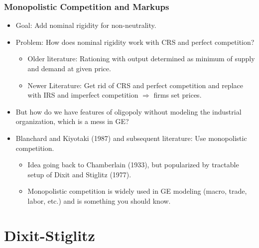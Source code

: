 \documentclass[english,xcolor=svgnames]{beamer}
\begin{document}
\begin{frame}
\frametitle{Monopolistic Competition and Markups}
\begin{itemize}
	\item Goal: Add nominal rigidity for non-neutrality.
	\item Problem: How does nominal rigidity work with CRS and
perfect competition?
	\begin{itemize}
		\item Older literature: Rationing with output determined as minimum of supply and demand at given price.
		\item Newer Literature: Get rid of CRS and perfect competition and replace with IRS and imperfect competition $\Rightarrow$ firms set prices.
	\end{itemize}
	\item But how do we have features of oligopoly without modeling the industrial organization, which is a mess in GE?
	\item Blanchard and Kiyotaki (1987) and subsequent literature: Use monopolistic competition.
	\begin{itemize}
		\item Idea going back to Chamberlain (1933), but popularized by tractable setup of Dixit and Stiglitz (1977).
	\item Monopolistic competition is widely used in GE modeling (macro, trade, labor, etc.) and is something you should know.
	\end{itemize}
\end{itemize}
\end{frame}



\section{Dixit-Stiglitz}
\end{document}
